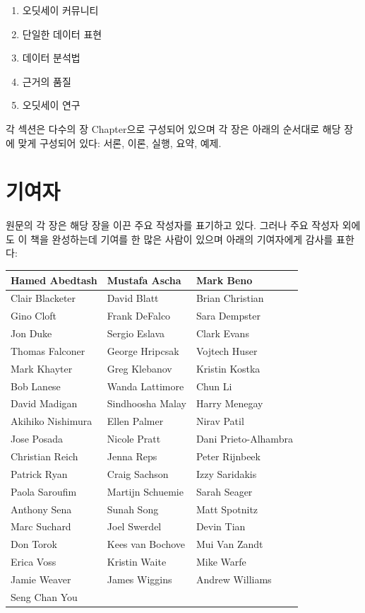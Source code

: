 \documentclass[10.5pt]{book}
\providecommand{\tightlist}{%
  \setlength{\itemsep}{0pt}\setlength{\parskip}{0pt}}
\theoremstyle{definition}
\theoremstyle{definition}
\theoremstyle{definition}
\theoremstyle{remark}
\begin{document}
\begin{enumerate}
\def\labelenumi{\Roman{enumi})}
\tightlist
\item
  오딧세이 커뮤니티
\item
  단일한 데이터 표현
\item
  데이터 분석법
\item
  근거의 품질
\item
  오딧세이 연구
\end{enumerate}

각 섹션은 다수의 장 Chapter으로 구성되어 있으며 각 장은 아래의 순서대로
해당 장에 맞게 구성되어 있다: 서론, 이론, 실행, 요약, 예제.

\section*{기여자}

원문의 각 장은 해당 장을 이끈 주요 작성자를 표기하고 있다. 그러나 주요
작성자 외에도 이 책을 완성하는데 기여를 한 많은 사람이 있으며 아래의
기여자에게 감사를 표한다:

\begin{tabular}{l|l|l}
\hline
Hamed Abedtash & Mustafa Ascha & Mark Beno\\
\hline
Clair Blacketer & David Blatt & Brian Christian\\
\hline
Gino Cloft & Frank DeFalco & Sara Dempster\\
\hline
Jon Duke & Sergio Eslava & Clark Evans\\
\hline
Thomas Falconer & George Hripcsak & Vojtech Huser\\
\hline
Mark Khayter & Greg Klebanov & Kristin Kostka\\
\hline
Bob Lanese & Wanda Lattimore & Chun Li\\
\hline
David Madigan & Sindhoosha Malay & Harry Menegay\\
\hline
Akihiko Nishimura & Ellen Palmer & Nirav Patil\\
\hline
Jose Posada & Nicole Pratt & Dani Prieto-Alhambra\\
\hline
Christian Reich & Jenna Reps & Peter Rijnbeek\\
\hline
Patrick Ryan & Craig Sachson & Izzy Saridakis\\
\hline
Paola Saroufim & Martijn Schuemie & Sarah Seager\\
\hline
Anthony Sena & Sunah Song & Matt Spotnitz\\
\hline
Marc Suchard & Joel Swerdel & Devin Tian\\
\hline
Don Torok & Kees van Bochove & Mui Van Zandt\\
\hline
Erica Voss & Kristin Waite & Mike Warfe\\
\hline
Jamie Weaver & James Wiggins & Andrew Williams\\
\hline
Seng Chan You &  & \\
\hline
\end{tabular}
\end{document}
